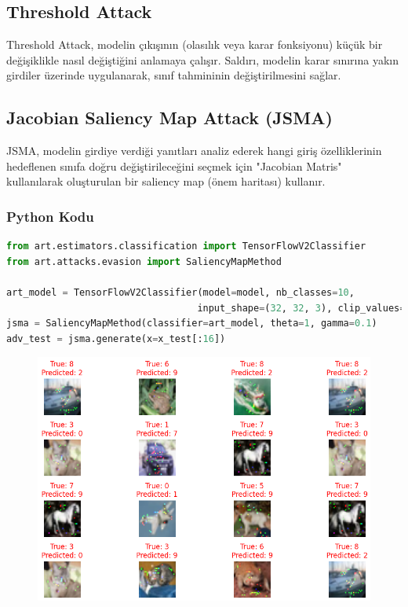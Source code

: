 \newpage

\subsection{Threshold Attack}

Threshold Attack, modelin çıkışının (olasılık veya karar fonksiyonu) küçük bir değişiklikle nasıl değiştiğini anlamaya çalışır. Saldırı, modelin karar sınırına yakın girdiler üzerinde uygulanarak, sınıf tahmininin değiştirilmesini sağlar.

\newpage

\subsection{Jacobian Saliency Map Attack (JSMA)} 

JSMA, modelin girdiye verdiği yanıtları analiz ederek hangi giriş özelliklerinin hedeflenen sınıfa doğru değiştirileceğini seçmek için "Jacobian Matris" kullanılarak oluşturulan bir saliency map (önem haritası) kullanır. 

\subsubsection{Python Kodu}

\begin{lstlisting}[language=Python]
from art.estimators.classification import TensorFlowV2Classifier
from art.attacks.evasion import SaliencyMapMethod

art_model = TensorFlowV2Classifier(model=model, nb_classes=10, 
                                  input_shape=(32, 32, 3), clip_values=(0, 1))
jsma = SaliencyMapMethod(classifier=art_model, theta=1, gamma=0.1)
adv_test = jsma.generate(x=x_test[:16])
\end{lstlisting}

\begin{figure}[h]
    \centering
    \includegraphics[width=1\textwidth]{images/jsma_results.png}
    \caption{}
\end{figure}

